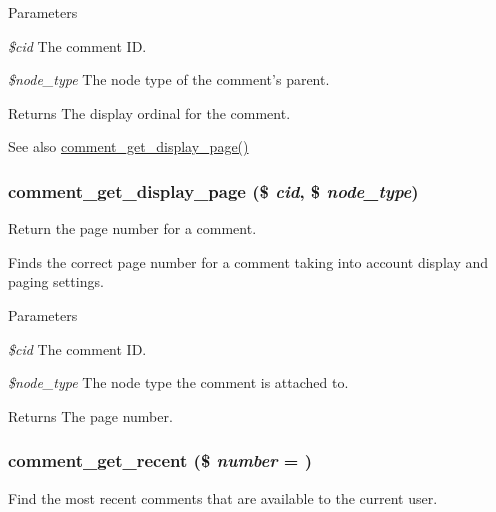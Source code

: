 \begin{DoxyParams}{Parameters}
\item[{\em \$cid}]The comment ID. \item[{\em \$node\_\-type}]The node type of the comment's parent. \end{DoxyParams}
\begin{DoxyReturn}{Returns}
The display ordinal for the comment. 
\end{DoxyReturn}
\begin{DoxySeeAlso}{See also}
\hyperlink{comment_8module_aa5aea9dcbfe48d409e40e1a37b5a9e50}{comment\_\-get\_\-display\_\-page()} 
\end{DoxySeeAlso}
\hypertarget{comment_8module_aa5aea9dcbfe48d409e40e1a37b5a9e50}{
\subsubsection[{comment\_\-get\_\-display\_\-page}]{\setlength{\rightskip}{0pt plus 5cm}comment\_\-get\_\-display\_\-page (\$ {\em cid}, \/  \$ {\em node\_\-type})}}
\label{comment_8module_aa5aea9dcbfe48d409e40e1a37b5a9e50}
Return the page number for a comment.

Finds the correct page number for a comment taking into account display and paging settings.


\begin{DoxyParams}{Parameters}
\item[{\em \$cid}]The comment ID. \item[{\em \$node\_\-type}]The node type the comment is attached to. \end{DoxyParams}
\begin{DoxyReturn}{Returns}
The page number. 
\end{DoxyReturn}
\hypertarget{comment_8module_aee855cbdc8d4b528e4d54817039fc760}{
\subsubsection[{comment\_\-get\_\-recent}]{\setlength{\rightskip}{0pt plus 5cm}comment\_\-get\_\-recent (\$ {\em number} = {})}}
\label{comment_8module_aee855cbdc8d4b528e4d54817039fc760}
Find the most recent comments that are available to the current user.


